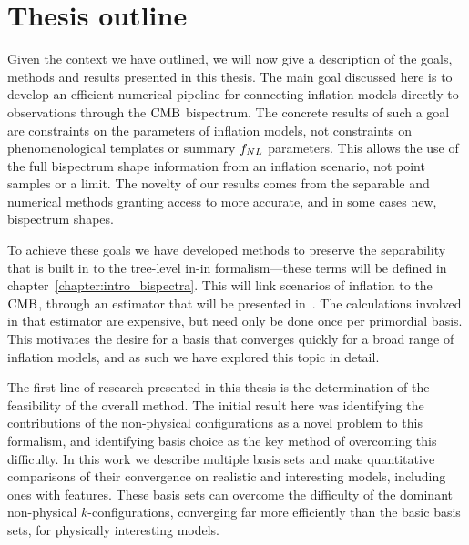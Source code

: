 

\section{Thesis outline}
Given the context we have outlined,
    we will now give a description of the goals, methods
    and results presented in this thesis.
    The main goal discussed here is to develop an efficient numerical pipeline for
    connecting inflation models directly to observations through the $\text{CMB}$ bispectrum.
    The concrete results of such a goal are constraints on the parameters of inflation models,
    not constraints on phenomenological templates or summary $f_{NL}$ parameters.
    This allows the use of the full bispectrum shape information from an inflation scenario,
    not point samples or a limit. The novelty of our results comes from the separable
    and numerical methods
    granting access to more accurate, and in some cases new, bispectrum shapes.


    To achieve these goals we have developed methods to preserve the
    separability that is built in to the tree-level in-in formalism---these
    terms will be defined in chapter~\ref{chapter:intro_bispectra}.
    This will link scenarios of inflation to the $\text{CMB}$,
    through an estimator that will be presented in~\cite{Sohn_2021}.
    The calculations involved in that estimator are expensive,
    but need only be done once per primordial basis.
    This motivates the desire for a basis that converges quickly for a broad range of inflation models,
    and as such we have explored this topic in detail.


The first line of research presented in this thesis
is the determination of the feasibility of the overall method.
The initial result here was identifying the contributions of the non-physical configurations
as a novel problem to this formalism,
and identifying basis choice as the key method of overcoming this difficulty.
In this work we describe multiple basis sets and make quantitative comparisons
of their convergence on realistic and interesting models, including ones with features.
These basis sets can overcome the difficulty of the dominant non-physical $k$-configurations,
converging far more efficiently than the basic basis sets, for physically interesting models.


